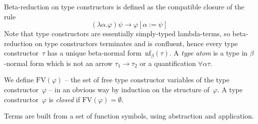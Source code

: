 \documentclass[runningheads,a4paper]{llncs}
\newcommand{\nf}{\mathrm{nf}}
\newcommand{\arrtype}{\rightarrow}
\newcommand{\FV}{\mathrm{FV}}
\begin{document}
\begin{definition}
  Beta-reduction on type constructors is defined as the compatible
  closure of the rule
  \[
  (\lambda\alpha.\varphi)\psi \to \varphi[\alpha := \psi]
  \]
  Note that type constructors are essentially simply-typed
  lambda-terms, so beta-reduction on type constructors terminates and
  is confluent, hence every type constructor~$\tau$ has a unique
  beta-normal form~$\nf_\beta(\tau)$. A \emph{type atom} is a type in
  $\beta$-normal form which is not an arrow $\tau_1\arrtype\tau_2$ or
  a quantification $\forall\alpha\tau$.

  We define $\FV(\varphi)$ -- the set of free type constructor
  variables of the type constructor~$\varphi$ -- in an obvious way by
  induction on the structure of~$\varphi$. A type
  constructor~$\varphi$ is \emph{closed} if
  $\FV(\varphi) = \emptyset$.
\end{definition}

Terms are built from a set of function symbols, using abstraction and
application.
\end{document}
